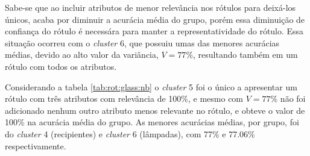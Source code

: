 Sabe-se que ao incluir atributos de menor relevância nos rótulos para deixá-los únicos, acaba por diminuir a acurácia média do grupo, porém essa diminuição de confiança do rótulo é necessára para manter a representatividade do rótulo. Essa situação ocorreu com o \textit{cluster} 6, que possuiu umas das menores acurácias médias, devido ao alto valor da variância, ${V=77\%}$, resultando  também em um rótulo com todos os atributos.

Considerando a tabela \ref{tab:rot:glass:nb} o \textit{cluster} 5 foi o único a apresentar um rótulo com três atributos com relevância de 100\%, e mesmo com ${V=77\%}$ não foi adicionado nenhum outro atributo menos relevante no rótulo, e obteve o valor de 100\% na acurácia média do grupo. As menores acurácias médias, por grupo, foi do \textit{cluster} 4 (recipientes) e \textit{cluster} 6 (lâmpadas), com 77\% e 77.06\% respectivamente.

